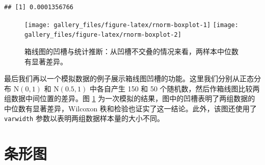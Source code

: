 \documentclass[
  b5paper,
  UTF8,twoside]{book}
\begin{document}
\begin{verbatim}
## [1] 0.0001356766
\end{verbatim}

\begin{figure}

{\centering \texttt{[image: gallery\_files/figure-latex/rnorm-boxplot-1]} \texttt{[image: gallery\_files/figure-latex/rnorm-boxplot-2]} 

}

\caption[箱线图的凹槽与统计推断]{箱线图的凹槽与统计推断：从凹槽不交叠的情况来看，两样本中位数有显著差异。}\label{fig:rnorm-boxplot}
\end{figure}

最后我们再以一个模拟数据的例子展示箱线图凹槽的功能。这里我们分别从正态分布 \(\mathrm{N}(0,1)\) 和 \(\mathrm{N}(0.5,1)\) 中各自产生 150 和 50 个随机数，然后作箱线图比较两组数据中间位置的差异。图 \ref{fig:rnorm-boxplot} 为一次模拟的结果，图中的凹槽表明了两组数据的中位数有显著差异，Wilcoxon 秩和检验也证实了这一结论。此外，该图还使用了 \texttt{varwidth} 参数以表明两组数据样本量的大小不同。

\section{条形图}\label{sec:barplot}
\end{document}
